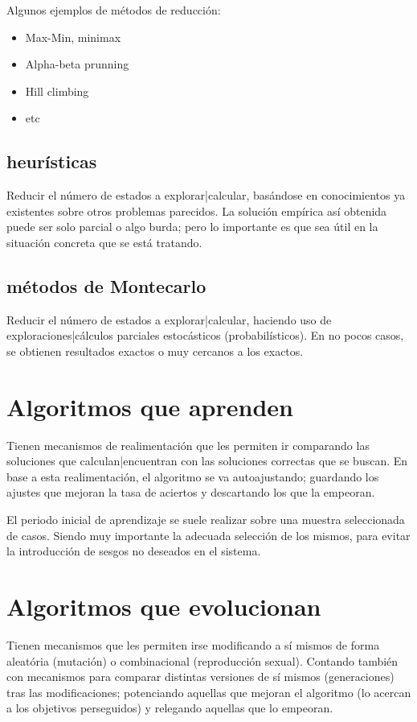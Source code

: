 \documentclass[spanish,12pt,a4paper,final,oneside]{book}
\begin{document}
Algunos ejemplos de métodos de reducción:
\begin{itemize}
\item Max-Min, minimax
\item Alpha-beta prunning
\item Hill climbing
\item etc
\end{itemize}

\subsection{heurísticas}
Reducir el número de estados a explorar|calcular, basándose en conocimientos ya existentes sobre otros problemas parecidos. La solución empírica así obtenida puede ser solo parcial o algo burda; pero lo importante es que sea útil en la situación concreta que se está tratando.

\subsection{métodos de Montecarlo}
Reducir el número de estados a explorar|calcular, haciendo uso de exploraciones|cálculos parciales estocásticos (probabilísticos). En no pocos casos, se obtienen resultados exactos o muy cercanos a los exactos.

\section{Algoritmos que aprenden}
Tienen mecanismos de realimentación que les permiten ir comparando las soluciones que calculan|encuentran con las soluciones correctas que se buscan. En base a esta realimentación, el algoritmo se va autoajustando; guardando los ajustes que mejoran la tasa de aciertos y descartando los que la empeoran.

El periodo inicial de aprendizaje se suele realizar sobre una muestra seleccionada de casos. Siendo muy importante la adecuada selección de los mismos, para evitar la introducción de sesgos no deseados en el sistema.

\section{Algoritmos que evolucionan}
Tienen mecanismos que les permiten irse modificando a sí mismos de forma aleatória (mutación) o combinacional (reproducción sexual). Contando también con mecanismos para comparar distintas versiones de sí mismos (generaciones) tras las modificaciones; potenciando aquellas que mejoran el algoritmo (lo acercan a los objetivos perseguidos) y relegando aquellas que lo empeoran.
\end{document}
